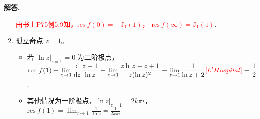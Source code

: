\documentclass[11pt]{ctexart}
\newenvironment{solution}{\par\noindent\textbf{解答. }}{\par}
\begin{document}
\begin{solution}
\begin{enumerate}[(1)]
              \textcolor{red}{由书上P75例5.9知，$\text{res}\ f(0)=-\text{J}_1(1)$， $\text{res}\ f(\infty)=\text{J}_1(1)$}.
        \item 孤立奇点 $z=1$。
              \begin{itemize}
                \item 若 $\displaystyle\ln{z}|_{z=1}=0$ 为二阶极点，\\[10pt]
                      $\displaystyle\text{res}\ f(1) = \lim_{z\to 1}\frac{\text{d}}{\text{d}z}\frac{z-1}{\ln{z}} 
                      = \lim_{z\to 1}\frac{z\ln{z}-z+1}{z(\ln{z})^2}
                      = \lim_{z\to 1}\frac{1}{\ln{z}+2}\textcolor{red}{\left[L'Hospital\right]}
                      =\frac{1}{2}$.
                \item 其他情况为一阶极点，$\displaystyle\ln{z}|_{z=1}=2k\pi i$，\\[10pt]
                      $\displaystyle\text{res}\ f(1) = \lim_{z\to 1}\frac{1}{\ln{z}} = \frac{1}{2k\pi i}$
              \end{itemize}
    \end{enumerate}
\end{solution}
\end{document}
